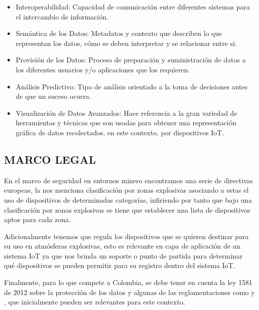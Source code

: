\documentclass[stu,12pt,floatsintext]{apa7}
\begin{document}
\begin{itemize}
		\item Interoperabilidad: Capacidad de comunicación entre diferentes sistemas para el intercambio de información.
		\item Semántica de los Datos: Metadatos y contexto que describen lo que representan los datos, cómo se deben interpretar y se relacionar entre si.
		\item Provisión de los Datos: Proceso de preparación y suministración de datos a los diferentes usuarios y/o aplicaciones que los requieren.
		\item Análisis Predictivo: Tipo de análisis orientado a la toma de decisiones antes de que un suceso ocurra.
		\item Visualización de Datos Avanzados: Hace referencia a la gran variedad de herramientas y técnicas que son usadas para obtener una representación gráfica de datos recolectados, en este contexto, por dispositivos IoT.
	\end{itemize}
	\subsection{MARCO LEGAL}
	En el marco de seguridad en entornos minero encontramos una serie de directivas europeas, la \cite{ATEX114Directive} nos menciona clasificación por zonas explosivas asociando a estas el uso de dispositivos de determinadas categorías, infiriendo por tanto que bajo una clasificación por zonas explosivas se tiene que establecer una lista de dispositivos aptos para cada zona.
	
	Adicionalmente tenemos \cite{Directive2014_34} que regula los dispositivos que se quieren destinar para su uso en atmósferas explosivas, esto es relevante en capa de aplicación de un sistema IoT ya que nos brinda un soporte o punto de partida para determinar qué dispositivos se pueden permitir para su registro dentro del sistema IoT.
	
	Finalmente, para lo que compete a Colombia, se debe tener en cuenta la ley 1581 de 2012 sobre la protección de los datos \cite{ley_estatutaria_1581_2012} y algunas de las reglamentaciones como \cite{decreto_1377_2013} y \cite{decreto_255_2022}, que inicialmente pueden ser relevantes para este contexto.
	
\end{document}
